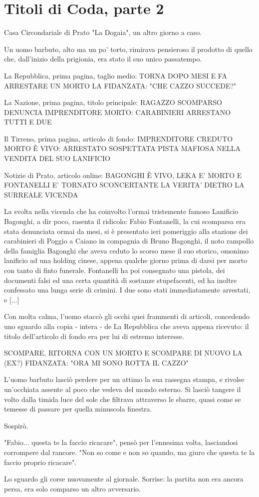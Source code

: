 \chapter{Titoli di Coda, parte 2}

Casa Circondariale di Prato "La Dogaia", un altro giorno a caso.

Un uomo barbuto, alto ma un po' torto, rimirava pensieroso il prodotto di quello che, dall'inizio della prigionia, era stato il suo unico passatempo.

La Repubblica, prima pagina, taglio medio:
TORNA DOPO MESI E FA ARRESTARE UN MORTO
LA FIDANZATA: "CHE CAZZO SUCCEDE?"

La Nazione, prima pagina, titolo principale:
RAGAZZO SCOMPARSO DENUNCIA IMPRENDITORE MORTO: 
CARABINIERI ARRESTANO TUTTI E DUE

Il Tirreno, prima pagina, articolo di fondo:
IMPRENDITORE CREDUTO MORTO È VIVO: ARRESTATO
SOSPETTATA PISTA MAFIOSA NELLA VENDITA DEL SUO LANIFICIO

Notizie di Prato, articolo online:
BAGONGHI È VIVO, LEKA E' MORTO E FONTANELLI E' TORNATO
SCONCERTANTE LA VERITA' DIETRO LA SURREALE VICENDA

La svolta nella vicenda che ha coinvolto l'ormai tristemente famoso Lanificio Bagonghi, a dir poco, rasenta il ridicolo: Fabio Fontanelli, la cui scomparsa era stata denunciata ormai da mesi, si è presentato ieri pomeriggio alla stazione dei carabinieri di Poggio a Caiano in compagnia di Bruno Bagonghi, il noto rampollo della famiglia Bagonghi che aveva ceduto lo scorso mese il suo storico, omonimo lanificio ad una holding cinese, appena qualche giorno prima di darsi per morto con tanto di finto funerale. Fontanelli ha poi consegnato una pistola, dei documenti falsi ed una certa quantità di sostanze stupefacenti, ed ha inoltre confessato una lunga serie di crimini. I due sono stati immediatamente arrestati, e [...]

Con molta calma, l'uomo staccò gli occhi quei frammenti di articoli, concedendo uno sguardo alla copia - intera - de La Repubblica che aveva appena ricevuto: il titolo dell'articolo di fondo era per lui di estremo interesse.

SCOMPARE, RITORNA CON UN MORTO E SCOMPARE DI NUOVO
LA (EX?) FIDANZATA: "ORA MI SONO ROTTA IL CAZZO" 

L'uomo barbuto lasciò perdere per un attimo la sua rassegna stampa, e rivolse un'occhiata assente al poco che vedeva del mondo esterno. Si lasciò tangere il volto dalla timida luce del sole che filtrava attraverso le sbarre, quasi come se temesse di passare per quella minuscola finestra. 

Sospirò. 

"Fabio... questa te la faccio ricacare", pensò per l'ennesima volta, lasciandosi corrompere dal rancore. "Non so come e non so quando, ma giuro che questa te la faccio proprio ricacare".

Lo sguardo gli corse nuovamente al giornale. Sorrise: la partita non era ancora persa, era solo comparso un altro avversario.
